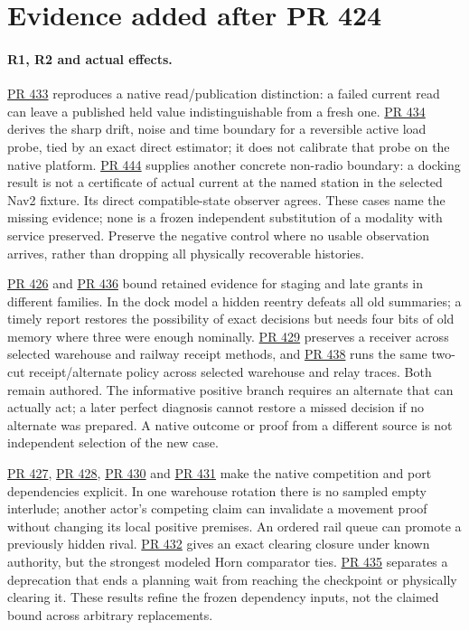 \documentclass[11pt]{article}
\newcommand{\pr}[1]{\href{https://github.com/eternal-november/eos-research-programmes/pull/#1}{PR #1}}
\begin{document}
\section*{Evidence added after PR 424}

\paragraph{R1, R2 and actual effects.}
\pr{433} reproduces a native read/publication distinction: a failed current read can leave a published held value indistinguishable from a fresh one. \pr{434} derives the sharp drift, noise and time boundary for a reversible active load probe, tied by an exact direct estimator; it does not calibrate that probe on the native platform. \pr{444} supplies another concrete non-radio boundary: a docking result is not a certificate of actual current at the named station in the selected Nav2 fixture. Its direct compatible-state observer agrees. These cases name the missing evidence; none is a frozen independent substitution of a modality with service preserved. Preserve the negative control where no usable observation arrives, rather than dropping all physically recoverable histories.
\par
\pr{426} and \pr{436} bound retained evidence for staging and late grants in different families. In the dock model a hidden reentry defeats all old summaries; a timely report restores the possibility of exact decisions but needs four bits of old memory where three were enough nominally. \pr{429} preserves a receiver across selected warehouse and railway receipt methods, and \pr{438} runs the same two-cut receipt/alternate policy across selected warehouse and relay traces. Both remain authored. The informative positive branch requires an alternate that can actually act; a later perfect diagnosis cannot restore a missed decision if no alternate was prepared. A native outcome or proof from a different source is not independent selection of the new case.
\par
\pr{427}, \pr{428}, \pr{430} and \pr{431} make the native competition and port dependencies explicit. In one warehouse rotation there is no sampled empty interlude; another actor's competing claim can invalidate a movement proof without changing its local positive premises. An ordered rail queue can promote a previously hidden rival. \pr{432} gives an exact clearing closure under known authority, but the strongest modeled Horn comparator ties. \pr{435} separates a deprecation that ends a planning wait from reaching the checkpoint or physically clearing it. These results refine the frozen dependency inputs, not the claimed bound across arbitrary replacements.
\end{document}
